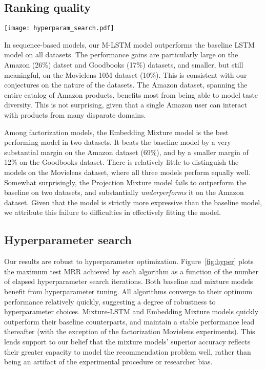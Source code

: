 \documentclass[sigconf]{acmart}
\begin{document}
\subsection{Ranking quality}
  \begin{figure*}[h]
    \centering
    \captionsetup{width=.8\linewidth}
    \caption{Maximum test MRR vs number of hyperparameter search iterations. Sequence-based models in the top row; factorization-based models in the bottom row.}
    \label{fig:hyper}
    \texttt{[image: hyperparam\_search.pdf]}
  \end{figure*}
In sequence-based models, our M-LSTM model outperforms the baseline LSTM model on all datasets. The performance gains are particularly large on the Amazon (26\%) datset and Goodbooks (17\%) datasets, and smaller, but still meaningful, on the Movielens 10M dataset (10\%). This is consistent with our conjectures on the nature of the datasets. The Amazon dataset, spanning the entire catalog of Amazon products, benefits most from being able to model taste diversity. This is not surprising, given that a single Amazon user can interact with products from many disparate domains.

Among factorization models, the Embedding Mixture model is the best performing model in two datasets. It beats the baseline model by a very substantial margin on the Amazon dataset (69\%), and by a smaller margin of 12\% on the Goodbooks dataset. There is relatively little to distinguish the models on the Movielens dataset, where all three models perform equally well. Somewhat surprisingly, the Projection Mixture model fails to outperform the baseline on two datasets, and substantially \emph{underperforms} it on the Amazon dataset. Given that the model is strictly more expressive than the baseline model, we attribute this failure to difficulties in effectively fitting the model.

\subsection{Hyperparameter search}
Our results are robust to hyperparameter optimization. Figure~\ref{fig:hyper} plots the maximum test MRR achieved by each algorithm as a function of the number of elapsed hyperparameter search iterations. Both baseline and mixture models benefit from hyperparameter tuning. All algorithms converge to their optimum performance relatively quickly, suggesting a degree of robustness to hyperparameter choices. Mixture-LSTM and Embedding Mixture models quickly outperform their baseline counterparts, and maintain a stable performance lead thereafter (with the exception of the factorization Movielens experiments). This lends support to our belief that the mixture models' superior accuracy reflects their greater capacity to model the recommendation problem well, rather than being an artifact of the experimental procedure or researcher bias.
\end{document}
